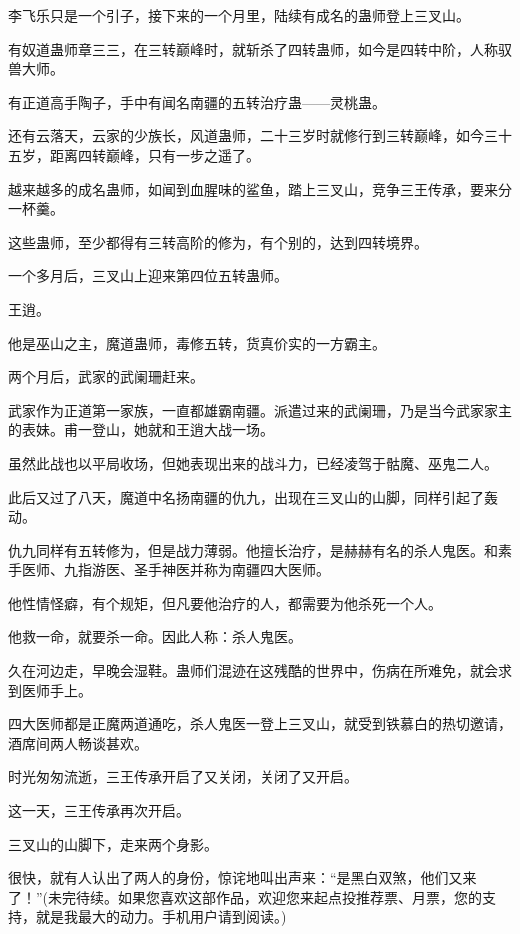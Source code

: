 \begin{this_body}
李飞乐只是一个引子，接下来的一个月里，陆续有成名的蛊师登上三叉山。

有奴道蛊师章三三，在三转巅峰时，就斩杀了四转蛊师，如今是四转中阶，人称驭兽大师。

有正道高手陶子，手中有闻名南疆的五转治疗蛊——灵桃蛊。

还有云落天，云家的少族长，风道蛊师，二十三岁时就修行到三转巅峰，如今三十五岁，距离四转巅峰，只有一步之遥了。

越来越多的成名蛊师，如闻到血腥味的鲨鱼，踏上三叉山，竞争三王传承，要来分一杯羹。

这些蛊师，至少都得有三转高阶的修为，有个别的，达到四转境界。

一个多月后，三叉山上迎来第四位五转蛊师。

王逍。

他是巫山之主，魔道蛊师，毒修五转，货真价实的一方霸主。

两个月后，武家的武阑珊赶来。

武家作为正道第一家族，一直都雄霸南疆。派遣过来的武阑珊，乃是当今武家家主的表妹。甫一登山，她就和王逍大战一场。

虽然此战也以平局收场，但她表现出来的战斗力，已经凌驾于骷魔、巫鬼二人。

此后又过了八天，魔道中名扬南疆的仇九，出现在三叉山的山脚，同样引起了轰动。

仇九同样有五转修为，但是战力薄弱。他擅长治疗，是赫赫有名的杀人鬼医。和素手医师、九指游医、圣手神医并称为南疆四大医师。

他性情怪癖，有个规矩，但凡要他治疗的人，都需要为他杀死一个人。

他救一命，就要杀一命。因此人称：杀人鬼医。

久在河边走，早晚会湿鞋。蛊师们混迹在这残酷的世界中，伤病在所难免，就会求到医师手上。

四大医师都是正魔两道通吃，杀人鬼医一登上三叉山，就受到铁慕白的热切邀请，酒席间两人畅谈甚欢。

时光匆匆流逝，三王传承开启了又关闭，关闭了又开启。

这一天，三王传承再次开启。

三叉山的山脚下，走来两个身影。

很快，就有人认出了两人的身份，惊诧地叫出声来：“是黑白双煞，他们又来了！”(未完待续。如果您喜欢这部作品，欢迎您来起点投推荐票、月票，您的支持，就是我最大的动力。手机用户请到阅读。)

\end{this_body}

